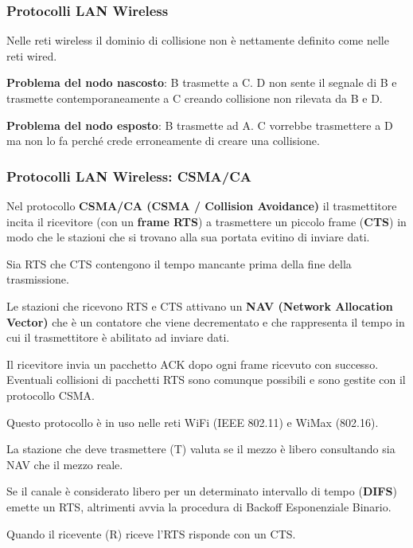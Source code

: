         \subsubsection{Protocolli LAN Wireless}
            Nelle reti wireless il dominio di collisione non è nettamente definito come nelle reti wired.

            \textbf{Problema del nodo nascosto}: B trasmette a C. D non sente il segnale di B e trasmette contemporaneamente a C creando collisione non rilevata da B e D.

            \textbf{Problema del nodo esposto}: B trasmette ad A. C vorrebbe trasmettere a D ma non lo fa perché crede erroneamente di creare una collisione.

        \subsubsection{Protocolli LAN Wireless: CSMA/CA}
            Nel protocollo \textbf{CSMA/CA (CSMA / Collision Avoidance)} il trasmettitore incita il ricevitore (con un \textbf{frame RTS}) a trasmettere un piccolo frame (\textbf{CTS}) in modo che le stazioni che si trovano alla sua portata evitino di inviare dati.
        
            Sia RTS che CTS contengono il tempo mancante prima della fine della trasmissione.
        
            Le stazioni che ricevono RTS e CTS attivano un \textbf{NAV (Network Allocation Vector)} che è un contatore che viene decrementato e che rappresenta il tempo in cui il trasmettitore è abilitato ad inviare dati.
        
            Il ricevitore invia un pacchetto ACK dopo ogni frame ricevuto con successo. Eventuali collisioni di pacchetti RTS sono comunque possibili e sono gestite con il protocollo CSMA.

            Questo protocollo è in uso nelle reti WiFi (IEEE 802.11) e WiMax (802.16).

            

            La stazione che deve trasmettere (T) valuta se il mezzo è libero consultando sia NAV che il mezzo reale.

            Se il canale è considerato libero per un determinato intervallo di tempo (\textbf{DIFS}) emette un RTS, altrimenti avvia la procedura di Backoff Esponenziale Binario.

            Quando il ricevente (R) riceve l'RTS risponde con un CTS.

